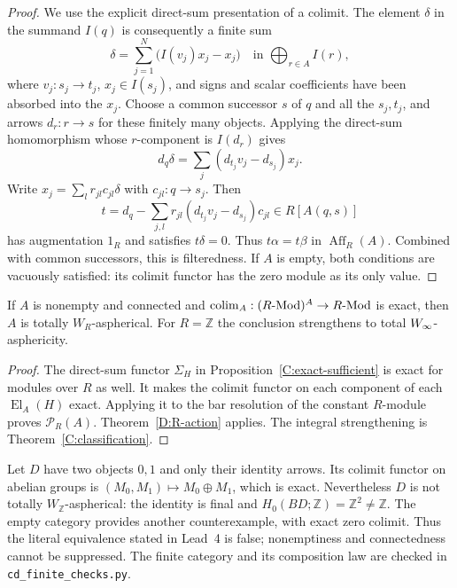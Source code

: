 \begin{proof}
We use the explicit direct-sum presentation of a colimit. The element $\delta$ in the summand $I(q)$ is consequently a finite sum
\[
 \delta=\sum_{j=1}^N
   \bigl(I(v_j)x_j-x_j\bigr)
 \quad\text{in }\bigoplus_{r\in A}I(r),
\]
where $v_j:s_j\to t_j$, $x_j\in I(s_j)$, and signs and scalar coefficients have been absorbed into the $x_j$. Choose a common successor $s$ of $q$ and all the $s_j,t_j$, and arrows $d_r:r\to s$ for these finitely many objects. Applying the direct-sum homomorphism whose $r$-component is $I(d_r)$ gives
\[
 d_q\delta=\sum_j(d_{t_j}v_j-d_{s_j})x_j.
\]
Write $x_j=\sum_l r_{jl}c_{jl}\delta$ with $c_{jl}:q\to s_j$. Then
\[
 t=d_q-\sum_{j,l}r_{jl}(d_{t_j}v_j-d_{s_j})c_{jl}
       \in R[A(q,s)]
\]
has augmentation $1_R$ and satisfies $t\delta=0$. Thus $t\alpha=t\beta$ in $\operatorname{Aff}_R(A)$. Combined with common successors, this is filteredness. If $A$ is empty, both conditions are vacuously satisfied: its colimit functor has the zero module as its only value.
\end{proof}

\begin{corollary}\label{D:exact-R-sufficient}
If $A$ is nonempty and connected and $\operatorname{colim}_A:(R\text{-}\mathrm{Mod})^A\to R\text{-}\mathrm{Mod}$ is exact, then $A$ is totally $W_R$-aspherical. For $R=\mathbb Z$ the conclusion strengthens to total $W_{\infty}$-asphericity.
\end{corollary}
\begin{proof}
The direct-sum functor $\Sigma_H$ in Proposition~\ref{C:exact-sufficient} is exact for modules over $R$ as well. It makes the colimit functor on each component of each $\operatorname{El}_A(H)$ exact. Applying it to the bar resolution of the constant $R$-module proves $\mathcal P_R(A)$. Theorem~\ref{D:R-action} applies. The integral strengthening is Theorem~\ref{C:classification}.
\end{proof}

\begin{example}\label{D:disconnected-counterexample}
Let $D$ have two objects $0,1$ and only their identity arrows. Its colimit functor on abelian groups is $(M_0,M_1)\mapsto M_0\oplus M_1$, which is exact. Nevertheless $D$ is not totally $W_{\mathbb Z}$-aspherical: the identity is final and $H_0(BD;\mathbb Z)=\mathbb Z^2\ne\mathbb Z$. The empty category provides another counterexample, with exact zero colimit. Thus the literal equivalence stated in Lead~4 is false; nonemptiness and connectedness cannot be suppressed. The finite category and its composition law are checked in \texttt{cd\_finite\_checks.py}.
\end{example}


